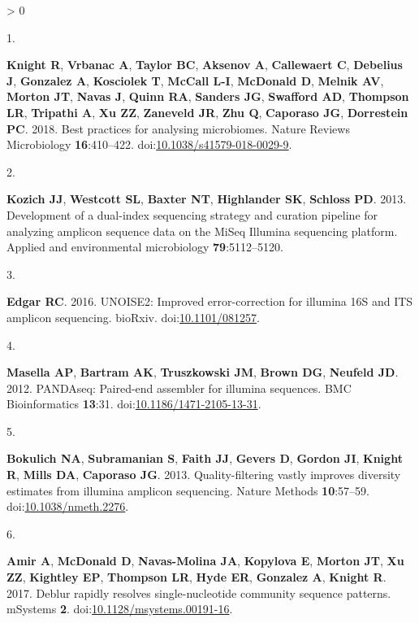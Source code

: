 \documentclass[
]{article}
\newlength{\cslhangindent}
\newlength{\csllabelwidth}
\newenvironment{CSLReferences}[3] %
 {%
  \setlength{\parindent}{0pt}
  \ifodd #1 \everypar{\setlength{\hangindent}{\cslhangindent}}\ignorespaces\fi
  \ifnum #2 > 0
  \setlength{\parskip}{#2\baselineskip}
  \fi
 }%
 {}
\newcommand{\CSLLeftMargin}[1]{\parbox[t]{\csllabelwidth}{#1}}
\newcommand{\CSLRightInline}[1]{\parbox[t]{\linewidth - \csllabelwidth}{#1}}
\begin{document}
\hypertarget{refs}{}
\begin{CSLReferences}{0}{0}
\leavevmode\hypertarget{ref-Knight2018}{}%
\CSLLeftMargin{1. }
\CSLRightInline{\textbf{Knight R}, \textbf{Vrbanac A}, \textbf{Taylor
BC}, \textbf{Aksenov A}, \textbf{Callewaert C}, \textbf{Debelius J},
\textbf{Gonzalez A}, \textbf{Kosciolek T}, \textbf{McCall L-I},
\textbf{McDonald D}, \textbf{Melnik AV}, \textbf{Morton JT},
\textbf{Navas J}, \textbf{Quinn RA}, \textbf{Sanders JG},
\textbf{Swafford AD}, \textbf{Thompson LR}, \textbf{Tripathi A},
\textbf{Xu ZZ}, \textbf{Zaneveld JR}, \textbf{Zhu Q}, \textbf{Caporaso
JG}, \textbf{Dorrestein PC}. 2018. Best practices for analysing
microbiomes. Nature Reviews Microbiology \textbf{16}:410--422.
doi:\href{https://doi.org/10.1038/s41579-018-0029-9}{10.1038/s41579-018-0029-9}.}

\leavevmode\hypertarget{ref-Kozich2013}{}%
\CSLLeftMargin{2. }
\CSLRightInline{\textbf{Kozich JJ}, \textbf{Westcott SL}, \textbf{Baxter
NT}, \textbf{Highlander SK}, \textbf{Schloss PD}. 2013. {Development of
a dual-index sequencing strategy and curation pipeline for analyzing
amplicon sequence data on the MiSeq Illumina sequencing platform}.
Applied and environmental microbiology \textbf{79}:5112--5120.}

\leavevmode\hypertarget{ref-Edgar2016}{}%
\CSLLeftMargin{3. }
\CSLRightInline{\textbf{Edgar RC}. 2016. {UNOISE}2: Improved
error-correction for illumina 16S and {ITS} amplicon sequencing.
bio{R}xiv. doi:\href{https://doi.org/10.1101/081257}{10.1101/081257}.}

\leavevmode\hypertarget{ref-Masella2012}{}%
\CSLLeftMargin{4. }
\CSLRightInline{\textbf{Masella AP}, \textbf{Bartram AK},
\textbf{Truszkowski JM}, \textbf{Brown DG}, \textbf{Neufeld JD}. 2012.
{PANDAseq}: Paired-end assembler for illumina sequences. {BMC}
Bioinformatics \textbf{13}:31.
doi:\href{https://doi.org/10.1186/1471-2105-13-31}{10.1186/1471-2105-13-31}.}

\leavevmode\hypertarget{ref-Bokulich2013}{}%
\CSLLeftMargin{5. }
\CSLRightInline{\textbf{Bokulich NA}, \textbf{Subramanian S},
\textbf{Faith JJ}, \textbf{Gevers D}, \textbf{Gordon JI}, \textbf{Knight
R}, \textbf{Mills DA}, \textbf{Caporaso JG}. 2013. Quality-filtering
vastly improves diversity estimates from illumina amplicon sequencing.
Nature Methods \textbf{10}:57--59.
doi:\href{https://doi.org/10.1038/nmeth.2276}{10.1038/nmeth.2276}.}

\leavevmode\hypertarget{ref-Amir2017}{}%
\CSLLeftMargin{6. }
\CSLRightInline{\textbf{Amir A}, \textbf{McDonald D},
\textbf{Navas-Molina JA}, \textbf{Kopylova E}, \textbf{Morton JT},
\textbf{Xu ZZ}, \textbf{Kightley EP}, \textbf{Thompson LR}, \textbf{Hyde
ER}, \textbf{Gonzalez A}, \textbf{Knight R}. 2017. Deblur rapidly
resolves single-nucleotide community sequence patterns. {mSystems}
\textbf{2}.
doi:\href{https://doi.org/10.1128/msystems.00191-16}{10.1128/msystems.00191-16}.}


\end{CSLReferences}
\end{document}
